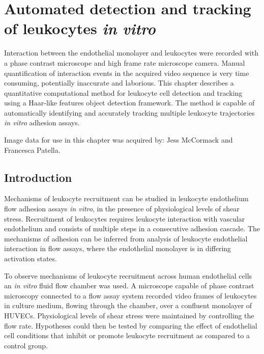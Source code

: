 \chapter{Automated detection and tracking of leukocytes \emph{in vitro}}
\label{leukocytes}
\ifpdf
    \graphicspath{{chapter_4/figs/}}
\fi


Interaction between the endothelial monolayer and leukocytes were recorded with a phase contrast microscope and high frame rate microscope camera. Manual quantification of interaction events in the acquired video sequence is very time consuming, potentially inaccurate and laborious. This chapter describes a quantitative computational method for leukocyte cell detection and tracking using a Haar-like features object detection framework. The method is capable of automatically identifying and accurately tracking multiple leukocyte trajectories \emph{in vitro} adhesion assays.

Image data for use in this chapter was acquired by: Jess McCormack and Francesca Patella.

\section{Introduction}
\label{leukocytes:introduction}
Mechanisms of leukocyte recruitment can be studied in leukocyte endothelium flow adhesion assays \emph{in vitro}, in the presence of physiological levels of shear stress. Recruitment of leukocytes requires leukocyte interaction with vascular endothelium and consists of multiple steps in a consecutive adhesion cascade. The mechanisms of adhesion can be inferred from analysis of leukocyte endothelial interaction in flow assays, where the endothelial monolayer is in differing activation states.

To observe mechanisms of leukocyte recruitment across human endothelial cells an \emph{in vitro} fluid flow chamber was used. A microscope capable of phase contrast microscopy connected to a flow assay system recorded video frames of leukocytes in culture medium, flowing through the chamber, over a confluent monolayer of HUVECs. Physiological levels of shear stress were maintained by controlling the flow rate. Hypotheses could then be tested by comparing the effect of endothelial cell conditions that inhibit or promote leukocyte recruitment as compared to a control group.

